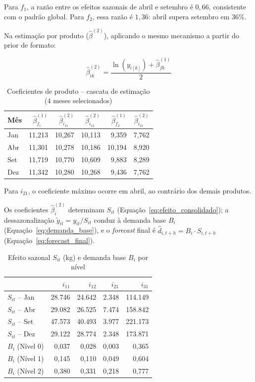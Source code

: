 \documentclass[fleqn,12pt,a4paper]{article}
\begin{document}
Para $f_1$, a razão entre os efeitos sazonais de abril e setembro é $0{,}66$, consistente
com o padrão global. Para $f_2$, essa razão é $1{,}36$: abril supera setembro em 36\%.

Na estimação por produto ($\hat{\beta}^{(2)}$), aplicando o mesmo mecanismo a partir do prior de formato:
\begin{ceqn}
\begin{equation*}
\hat{\beta}^{(2)}_{ik} = \frac{\ln(y_{i[k]}) + \hat{\beta}^{(1)}_{fk}}{2}
\end{equation*}
\end{ceqn}

\begin{table}[ht]
\centering
\small
\caption{Coeficientes de produto -- cascata de estimação (4 meses selecionados)}
\label{tab:beta2}
\begin{tabular}{lrrrrr}
\toprule
\textbf{Mês}
  & $\hat{\beta}^{(1)}_{f_1}$
  & $\hat{\beta}^{(2)}_{i_{11}}$
  & $\hat{\beta}^{(2)}_{i_{12}}$
  & $\hat{\beta}^{(1)}_{f_2}$
  & $\hat{\beta}^{(2)}_{i_{21}}$ \\
\midrule
Jan & 11,213 & 10,267 & 10,113 &  9,359 & 7,762 \\
Abr & 11,301 & 10,278 & 10,186 & 10,194 & 8,920 \\
Set & 11,719 & 10,770 & 10,609 &  9,883 & 8,289 \\
Dez & 11,342 & 10,280 & 10,268 &  9,436 & 7,762 \\
\bottomrule
\end{tabular}
\end{table}

Para $i_{21}$, o coeficiente máximo ocorre em abril, ao contrário dos demais produtos.

Os coeficientes $\hat{\beta}^{(2)}_i$ determinam $S_{it}$
(Equação~\eqref{eq:efeito_consolidado}); a dessazonalização $\tilde{y}_{it} = y_{it}/S_{it}$
conduz à demanda base $B_i$ (Equação~\eqref{eq:demanda_base}), e o \textit{forecast} final
é $\hat{d}_{i,t+h} = B_i \cdot S_{i,t+h}$ (Equação~\eqref{eq:forecast_final}).

\begin{table}[ht]
\centering
\small
\caption{Efeito sazonal $S_{it}$ (kg) e demanda base $B_i$ por nível}
\label{tab:sit}
\begin{tabular}{lrrrr}
\toprule
 & $i_{11}$ & $i_{12}$ & $i_{21}$ & $i_{31}$ \\
\midrule
$S_{it}$ -- Jan &  28.746 &  24.642 &   2.348 &  114.149 \\
$S_{it}$ -- Abr &  29.082 &  26.525 &   7.474 &  158.842 \\
$S_{it}$ -- Set &  47.573 &  40.493 &   3.977 &  221.173 \\
$S_{it}$ -- Dez &  29.122 &  28.774 &   2.348 &  173.871 \\
\midrule
$B_i$ (Nível 0) & 0,037 & 0,028 & 0,003 & 0,365 \\
$B_i$ (Nível 1) & 0,145 & 0,110 & 0,049 & 0,604 \\
$B_i$ (Nível 2) & 0,380 & 0,331 & 0,218 & 0,777 \\
\bottomrule
\end{tabular}
\end{table}
\end{document}
